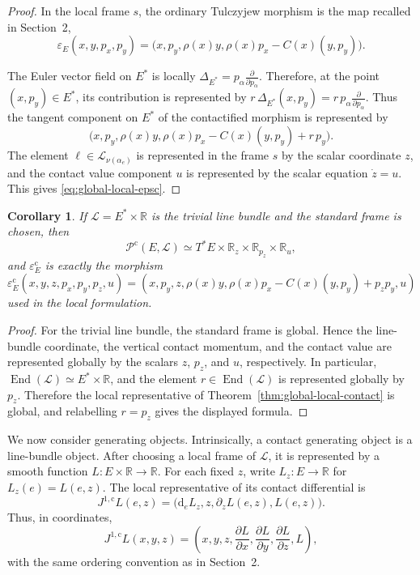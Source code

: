 \documentclass[11pt]{article}
\newtheorem{corollary}[theorem]{Corollary}
\newcommand{\R}{\mathbb{R}}
\newcommand{\dd}{\mathrm{d}}
\newcommand{\mc}[1]{\mathcal{#1}}
\newcommand{\Lbundle}{\mathcal{L}}
\begin{document}
\begin{proof}
In the local frame \(s\), the ordinary Tulczyjew morphism is the map recalled in
Section~2,
\[
\varepsilon_E(x,y,p_x,p_y)
=
\bigl(x,p_y,\rho(x)y,\rho(x)p_x-C(x)(y,p_y)\bigr).
\]

The Euler vector field on \(E^*\) is locally
$\Delta_{E^*}
=
p_\alpha\frac{\partial}{\partial p_\alpha}$. Therefore, at the point \((x,p_y)\in E^*\), its contribution is represented by
$r\,\Delta_{E^*}(x,p_y)=r\,p_\alpha\frac{\partial}{\partial p_\alpha}$. Thus the tangent component on \(E^*\) of the contactified morphism is represented by
\[
\bigl(
x,p_y,
\rho(x)y,
\rho(x)p_x-C(x)(y,p_y)+r\,p_y
\bigr).
\]
The element \(\ell\in\Lbundle_{\nu(\alpha_e)}\) is represented in the frame \(s\)
by the scalar coordinate \(z\), and the contact value
component \(u\) is represented by the scalar equation \(\dot z=u\). This gives
\eqref{eq:global-local-epsc}.
\end{proof}

\begin{corollary}
\label{cor:trivial-contactization}
If \(\Lbundle=E^*\times\R\) is the trivial line bundle and the standard frame is
chosen, then
\[
\mc P^{\mathrm c}(E,\Lbundle)
\simeq
T^*E\times\R_z\times\R_{p_z}\times\R_u,
\]
and \(\varepsilon_E^{\mathrm c}\) is exactly the morphism
\[
\varepsilon_E^{\mathrm c}(x,y,z,p_x,p_y,p_z,u)
=
\left(
x,p_y,z,
\rho(x)y,
\rho(x)p_x-C(x)(y,p_y)+p_zp_y,
u
\right)
\]
used in the local formulation.
\end{corollary}

\begin{proof}
For the trivial line bundle, the standard frame is global. Hence the line-bundle
coordinate, the vertical contact momentum, and the contact value are represented
globally by the scalars \(z\), \(p_z\), and \(u\), respectively. In particular,
\(\operatorname{End}(\Lbundle)\simeq E^*\times\R\), and the element
\(r\in\operatorname{End}(\Lbundle)\) is represented globally by \(p_z\).
Therefore the local representative of Theorem~\ref{thm:global-local-contact} is
global, and relabelling \(r=p_z\) gives the displayed formula.
\end{proof}

We now consider generating objects. Intrinsically, a contact generating object is a
line-bundle object. After choosing a local frame of \(\Lbundle\), it is represented
by a smooth function \(L:E\times\R\to\R\). For each fixed \(z\), write
\(L_z:E\to\R\) for \(L_z(e)=L(e,z)\). The local representative of its contact
differential is
\[
J^{1,\mathrm c}L(e,z)
=
\bigl(\dd_eL_z,z,\partial_zL(e,z),L(e,z)\bigr).
\]
Thus, in coordinates,
\[
J^{1,\mathrm c}L(x,y,z)
=
\left(
x,y,z,
\frac{\partial L}{\partial x},
\frac{\partial L}{\partial y},
\frac{\partial L}{\partial z},
L
\right),
\]
with the same ordering convention as in Section~2.
\end{document}
